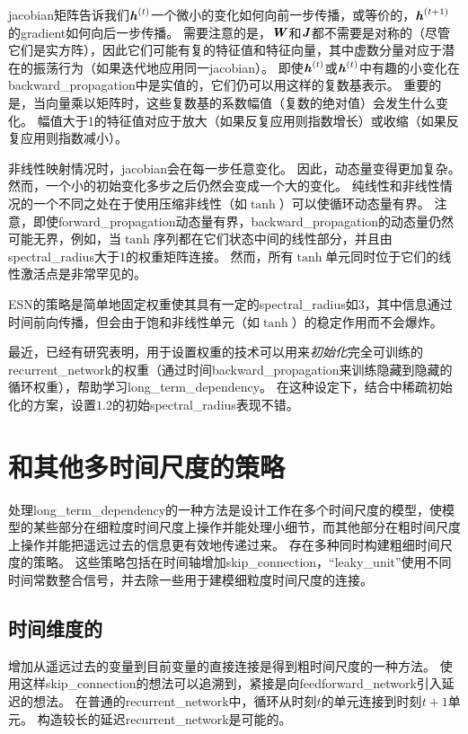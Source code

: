 \gls{jacobian}矩阵告诉我们$\boldsymbol{\mathit{h}}^{(t)}$一个微小的变化如何向前一步传播，或等价的，$\boldsymbol{\mathit{h}}^{(t+1)}$的\gls{gradient}如何向后一步传播。
需要注意的是，$\boldsymbol{\mathit{W}}$和$\boldsymbol{\mathit{J}}$都不需要是对称的（尽管它们是实方阵），因此它们可能有复的特征值和特征向量，其中虚数分量对应于潜在的振荡行为（如果迭代地应用同一\gls{jacobian}）。
即使$\boldsymbol{\mathit{h}}^{(t)}$或$\boldsymbol{\mathit{h}}^{(t)}$中有趣的小变化在\gls{backward_propagation}中是实值的，它们仍可以用这样的复数基表示。
重要的是，当向量乘以矩阵时，这些复数基的系数幅值（复数的绝对值）会发生什么变化。
幅值大于1的特征值对应于放大（如果反复应用则指数增长）或收缩（如果反复应用则指数减小）。

非线性映射情况时，\gls{jacobian}会在每一步任意变化。
因此，动态量变得更加复杂。
然而，一个小的初始变化多步之后仍然会变成一个大的变化。
纯线性和非线性情况的一个不同之处在于使用压缩非线性（如$\tanh$）可以使循环动态量有界。
注意，即使\gls{forward_propagation}动态量有界，\gls{backward_propagation}的动态量仍然可能无界，例如，当$\tanh$序列都在它们状态中间的线性部分，并且由\gls{spectral_radius}大于1的权重矩阵连接。
然而，所有$\tanh$单元同时位于它们的线性激活点是非常罕见的。


\gls{ESN}的策略是简单地固定权重使其具有一定的\gls{spectral_radius}如3，其中信息通过时间前向传播，但会由于饱和非线性单元（如$\tanh$）的稳定作用而不会爆炸。

最近，已经有研究表明，用于设置权重的技术可以用来\emph{初始化}完全可训练的\gls{recurrent_network}的权重（通过时间\gls{backward_propagation}来训练隐藏到隐藏的循环权重），帮助学习\gls{long_term_dependency}\citep{Sutskever-thesis2012,sutskeverimportance}。
在这种设定下，结合中稀疏初始化的方案，设置$1.2$的初始\gls{spectral_radius}表现不错。

\section{和其他多时间尺度的策略}
\label{sec:leaky_units_and_other_strategiesfor_multiple_time_scales}
处理\gls{long_term_dependency}的一种方法是设计工作在多个时间尺度的模型，使模型的某些部分在细粒度时间尺度上操作并能处理小细节，而其他部分在粗时间尺度上操作并能把遥远过去的信息更有效地传递过来。
存在多种同时构建粗细时间尺度的策略。
这些策略包括在时间轴增加\gls{skip_connection}，``\gls{leaky_unit}''使用不同时间常数整合信号，并去除一些用于建模细粒度时间尺度的连接。

\subsection{时间维度的}
\label{sec:adding_skip_connections_through_time}
增加从遥远过去的变量到目前变量的直接连接是得到粗时间尺度的一种方法。
使用这样\gls{skip_connection}的想法可以追溯到\cite{Lin-ieeetnn96}，紧接是向\gls{feedforward_network}引入延迟的想法\citep{Lang+Hinton88}。
在普通的\gls{recurrent_network}中，循环从时刻$t$的单元连接到时刻$t+1$单元。
构造较长的延迟\gls{recurrent_network}是可能的\citep{Bengio91z}。

